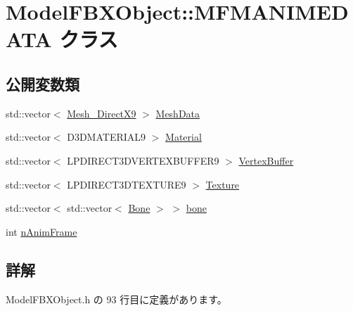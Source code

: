 \hypertarget{class_model_f_b_x_object_1_1_m_f_m_a_n_i_m_e_d_a_t_a}{}\section{Model\+F\+B\+X\+Object\+:\+:M\+F\+M\+A\+N\+I\+M\+E\+D\+A\+TA クラス}
\label{class_model_f_b_x_object_1_1_m_f_m_a_n_i_m_e_d_a_t_a}
\subsection*{公開変数類}
\begin{DoxyCompactItemize}
\item 
std\+::vector$<$ \mbox{\hyperlink{struct_model_f_b_x_object_1_1_mesh___direct_x9}{Mesh\+\_\+\+Direct\+X9}} $>$ \mbox{\hyperlink{class_model_f_b_x_object_1_1_m_f_m_a_n_i_m_e_d_a_t_a_a6e11a1ed981b745767a2baf49b449aab}{Mesh\+Data}}
\item 
std\+::vector$<$ D3\+D\+M\+A\+T\+E\+R\+I\+A\+L9 $>$ \mbox{\hyperlink{class_model_f_b_x_object_1_1_m_f_m_a_n_i_m_e_d_a_t_a_a2e0043aae6b864298a4c229155e929c9}{Material}}
\item 
std\+::vector$<$ L\+P\+D\+I\+R\+E\+C\+T3\+D\+V\+E\+R\+T\+E\+X\+B\+U\+F\+F\+E\+R9 $>$ \mbox{\hyperlink{class_model_f_b_x_object_1_1_m_f_m_a_n_i_m_e_d_a_t_a_a175ab6151344cd3e7c60dbfbe07bfe6a}{Vertex\+Buffer}}
\item 
std\+::vector$<$ L\+P\+D\+I\+R\+E\+C\+T3\+D\+T\+E\+X\+T\+U\+R\+E9 $>$ \mbox{\hyperlink{class_model_f_b_x_object_1_1_m_f_m_a_n_i_m_e_d_a_t_a_ad8d74d2140425ae1bb9b1f67e7803a27}{Texture}}
\item 
std\+::vector$<$ std\+::vector$<$ \mbox{\hyperlink{struct_model_f_b_x_object_1_1_bone}{Bone}} $>$ $>$ \mbox{\hyperlink{class_model_f_b_x_object_1_1_m_f_m_a_n_i_m_e_d_a_t_a_af2a776aa1581333306df20e221fc2948}{bone}}
\item 
int \mbox{\hyperlink{class_model_f_b_x_object_1_1_m_f_m_a_n_i_m_e_d_a_t_a_a2005997c789885e7c301af008c0f5074}{n\+Anim\+Frame}}
\end{DoxyCompactItemize}


\subsection{詳解}


 Model\+F\+B\+X\+Object.\+h の 93 行目に定義があります。



